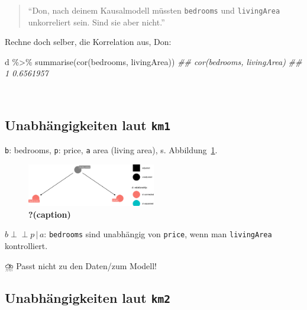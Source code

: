 \documentclass[
  a4paper,
  DIV=11]{scrreprt}
\newenvironment{Shaded}{\begin{snugshade}}{\end{snugshade}}
\newcommand{\DocumentationTok}[1]{\textcolor[rgb]{0.37,0.37,0.37}{\textit{#1}}}
\newcommand{\FunctionTok}[1]{\textcolor[rgb]{0.28,0.35,0.67}{#1}}
\newcommand{\NormalTok}[1]{\textcolor[rgb]{0.00,0.23,0.31}{#1}}
\newcommand{\SpecialCharTok}[1]{\textcolor[rgb]{0.37,0.37,0.37}{#1}}
\theoremstyle{definition}
\theoremstyle{remark}
\begin{document}
\begin{quote}
``Don, nach deinem Kausalmodell müssten \texttt{bedrooms} und
\texttt{livingArea} unkorreliert sein. Sind sie aber nicht.''
\end{quote}

Rechne doch selber, die Korrelation aus, Don:

\begin{Shaded}
\begin{Highlighting}[]
\NormalTok{d }\SpecialCharTok{\%\textgreater{}\%} 
  \FunctionTok{summarise}\NormalTok{(}\FunctionTok{cor}\NormalTok{(bedrooms, livingArea))}
\DocumentationTok{\#\#   cor(bedrooms, livingArea)}
\DocumentationTok{\#\# 1                 0.6561957}
\end{Highlighting}
\end{Shaded}

👩

\hypertarget{unabhuxe4ngigkeiten-laut-km1}{%
\subsection{\texorpdfstring{Unabhängigkeiten laut
\texttt{km1}}{Unabhängigkeiten laut km1}}\label{unabhuxe4ngigkeiten-laut-km1}}

\texttt{b}: bedrooms, \texttt{p}: price, \texttt{a} area (living area),
s. Abbildung~\ref{fig-km1}.

\begin{figure}

{\centering \includegraphics[width=0.5\textwidth,height=\textheight]{./kausal_files/figure-pdf/fig-km1-1.pdf}

}

\caption{\label{fig-km1}\textbf{?(caption)}}

\end{figure}

\(b \perp \!\!\! \perp p \, |\, a\): \texttt{bedrooms} sind unabhängig
von \texttt{price}, wenn man \texttt{livingArea} kontrolliert.

⛈️ Passt nicht zu den Daten/zum Modell!

\hypertarget{unabhuxe4ngigkeiten-laut-km2}{%
\subsection{\texorpdfstring{Unabhängigkeiten laut
\texttt{km2}}{Unabhängigkeiten laut km2}}\label{unabhuxe4ngigkeiten-laut-km2}}
\end{document}
